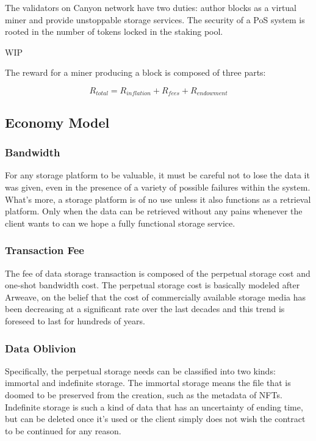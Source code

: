 \documentclass[]{article}
\newcounter{subsubsubsection}[subsubsection]
\begin{document}

The validators on Canyon network have two duties: author blocks as a virtual miner and provide unstoppable storage services. The security of a PoS system is rooted in the number of tokens locked in the staking pool.

WIP


The reward for a miner producing a block is composed of three parts:

$$
R_{total} = R_{inflation} + R_{fees} + R_{endowment}
$$

\subsection{Economy Model}

\subsubsection{Bandwidth}

For any storage platform to be valuable, it must be careful not to lose the data it was given, even in the presence of a variety of possible failures within the system. What's more, a storage platform is of no use unless it also functions as a retrieval platform. Only when the data can be retrieved without any pains whenever the client wants to can we hope a fully functional storage service.

\subsubsection{Transaction Fee}

The fee of data storage transaction is composed of the perpetual storage cost and one-shot bandwidth cost. The perpetual storage cost is basically modeled after Arweave, on the belief that the cost of commercially available storage media has been decreasing at a significant rate over the last decades and this trend is foreseed to last for hundreds of years.

\subsubsection{Data Oblivion}

Specifically, the perpetual storage needs can be classified into two kinds: immortal and indefinite storage. The immortal storage means the file that is doomed to be preserved from the creation, such as the metadata of NFTs. Indefinite storage is such a kind of data that has an uncertainty of ending time, but can be deleted once it's used or the client simply does not wish the contract to be continued for any reason.
\end{document}

